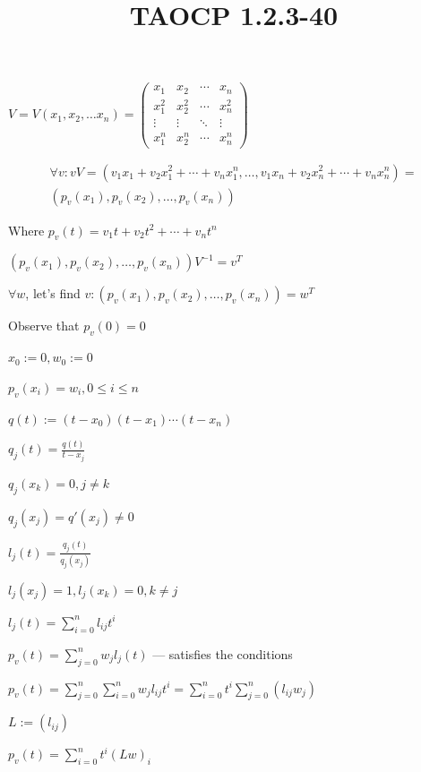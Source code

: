 \documentclass{article}
\title{TAOCP 1.2.3\mbox{-}40}
\begin{document}
\maketitle

\( V = V(x_{1}, x_{2}, \ldots x_{n}) = \left(\begin{matrix} x_{1} & x_{2} & \cdots & x_{n} \\ x_{1}^{2} & x_{2}^{2} & \cdots & x_{n}^{2} \\ \vdots & \vdots & \ddots & \vdots \\ x_{1}^{n} & x_{2}^{n} & \cdots & x_{n}^{n} \end{matrix}\right) \)

\begin{multline*}
\forall v: vV = (v_{1}x_{1}+v_{2}x_{1}^{2}+\cdots+v_{n}x_{1}^{n},\ldots, v_{1}x_{n}+v_{2}x_{n}^{2}+\cdots+v_{n}x_{n}^{n}) = \\
(p_{v}(x_{1}),p_{v}(x_{2}),\ldots,p_{v}(x_{n}))
\end{multline*}

Where \( p_{v}(t) = v_{1}t + v_{2}t^{2} + \cdots + v_{n}t^{n} \)

\( (p_{v}(x_{1}),p_{v}(x_{2}),\ldots,p_{v}(x_{n}))V^{-1} = v^{T} \)

\( \forall w \), let's find \( v: (p_{v}(x_{1}),p_{v}(x_{2}),\ldots,p_{v}(x_{n})) = w^{T} \)

Observe that \( p_{v}(0) = 0 \)

\( x_{0} := 0, w_{0} := 0 \)

\( p_{v}(x_{i}) = w_{i}, 0 \leq i \leq n \)

\( q(t) := (t-x_{0})(t-x_{1})\cdots(t-x_{n}) \)

\( q_{j}(t) = \frac{q(t)}{t-x_{j}} \)

\( q_{j}(x_{k}) = 0, j \neq k \)

\( q_{j}(x_{j}) = q'(x_{j}) \neq 0 \)

\( l_{j}(t) = \frac{q_{j}(t)}{q_{j}(x_{j})} \)

\( l_{j}(x_{j}) = 1, l_{j}(x_{k}) = 0, k \neq j \)

\( l_{j}(t) = \sum_{i=0}^{n} l_{ij}t^{i} \)

\( p_{v}(t) = \sum_{j=0}^{n} w_{j} l_{j}(t) \) --- satisfies the conditions

\( p_{v}(t) = \sum_{j=0}^{n}\sum_{i=0}^{n} w_{j} l_{ij}t^{i} = \sum_{i=0}^{n} t^{i} \sum_{j=0}^{n}(l_{ij} w_{j}) \)

\( L := (l_{ij}) \)

\( p_{v}(t) = \sum_{i=0}^{n} t^{i} {(Lw)}_{i} \)
\end{document}
